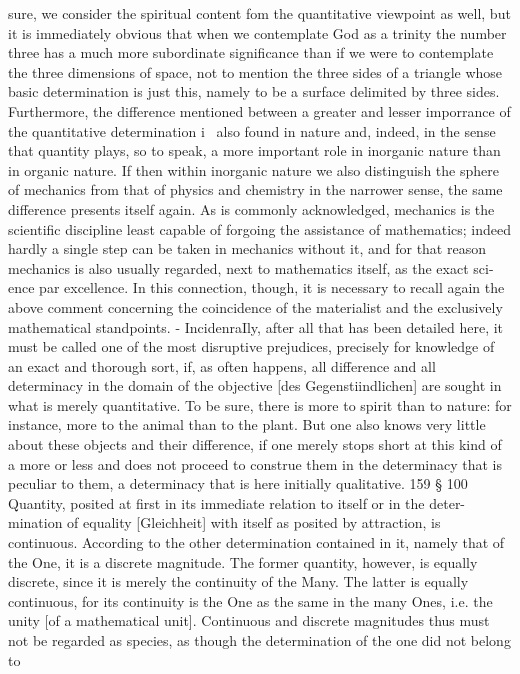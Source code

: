 sure, we consider the spiritual content f{om the quantitative viewpoint as well, but
it is immediately obvious that when we contemplate God as a trinity the number
three has a much more subordinate significance than if we were to contemplate
the three dimensions of space, not to mention the three sides of a triangle whose
basic determination is just this, namely to be a surface delimited by three sides.
Furthermore, the difference mentioned between a greater and lesser imporrance
of the quantitative determination i~ also found in nature and, indeed, in the sense
that quantity plays, so to speak, a more important role in inorganic nature than
in organic nature. If then within inorganic nature we also distinguish the sphere
of mechanics from that of physics and chemistry in the narrower sense, the same
difference presents itself again. As is commonly acknowledged, mechanics is the
scientific discipline least capable of forgoing the assistance of mathematics; indeed
hardly a single step can be taken in mechanics without it, and for that reason
mechanics is also usually regarded, next to mathematics itself, as the exact sci-
ence par excellence. In this connection, though, it is necessary to recall again the
above comment concerning the coincidence of the materialist and the exclusively
mathematical standpoints. - IncidenraIly, after all that has been detailed here, it
must be called one of the most disruptive prejudices, precisely for knowledge of
an exact and thorough sort, if, as often happens, all difference and all determinacy
in the domain of the objective [des Gegenstiindlichen] are sought in what is merely
quantitative. To be sure, there is more to spirit than to nature: for instance, more
to the animal than to the plant. But one also knows very little about these objects
and their difference, if one merely stops short at this kind of a more or less and
does not proceed to construe them in the determinacy that is peculiar to them, a
determinacy that is here initially qualitative.
159
§ 100
Quantity, posited at first in its immediate relation to itself or in the deter-
mination of equality [Gleichheit] with itself as posited by attraction, is
continuous. According to the other determination contained in it, namely
that of the One, it is a discrete magnitude. The former quantity, however, is
equally discrete, since it is merely the continuity of the Many. The latter is
equally continuous, for its continuity is the One as the same in the many
Ones, i.e. the unity [of a mathematical unit].
Continuous and discrete magnitudes thus must not be regarded
as species, as though the determination of the one did not belong to
}
